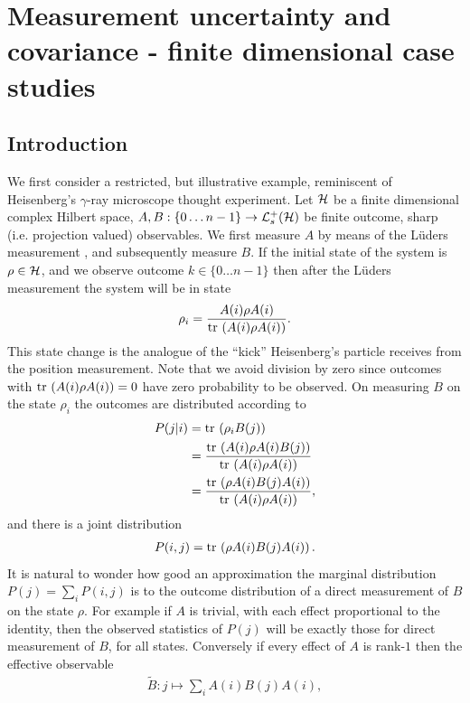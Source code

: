 
\chapter{Measurement uncertainty and covariance - finite dimensional case studies}
\label{chap:cov-meas-ur}
\section{Introduction}

We first consider a restricted, but illustrative example, reminiscent of Heisenberg's $\gamma$-ray microscope thought experiment. Let $\mathcal{H}$ be a finite dimensional complex Hilbert space, $A, B:\{0\hdots n-1\}\to\posops[\hcal]$ be finite outcome, sharp (i.e. projection valued) observables. We first measure $A$ by means of the L\"uders measurement \cites{doi:10.1063/1.528831}{Busch2009-compendium-of-physics-luders}, and subsequently measure $B$. If the initial state of the system is $\rho\in\mathcal{H}$, and we observe outcome $k\in\{0\hdots n-1\}$ then after the L\"uders measurement the system will be in state
\begin{align}
  \rho_i = \frac{A(i)\rho A(i)}{\tr{A(i)\rho A(i)}}.
\end{align}
This state change is the analogue of the ``kick'' Heisenberg's particle receives from the position measurement. Note that we avoid division by zero since outcomes with $\tr{A(i)\rho A(i)} = 0$ have zero probability to be observed. 
On measuring $B$ on the state $\rho_i$ the outcomes are distributed according to
\begin{align}
  P(j|i) &= \tr{\rho_i B(j)}\\
         &= \frac{\tr{A(i)\rho A(i) B(j)}}{\tr{A(i)\rho A(i)}}\\
         &= \frac{\tr{\rho A(i) B(j)A(i)}}{\tr{A(i)\rho A(i)}},
\end{align}
and there is a joint distribution
\begin{align}
  P(i,j) = \tr{\rho A(i) B(j)A(i)}.
\end{align}
It is natural to wonder how good an approximation the marginal distribution $P(j) = \sum_i P(i,j)$ is to the outcome distribution of a direct measurement of $B$ on the state $\rho$. For example if $A$ is trivial, with each effect proportional to the identity, then the observed statistics of $P(j)$ will be exactly those for direct measurement of $B$, for all states. Conversely if every effect of $A$ is rank-$1$ then the effective observable
\begin{align}
  \tilde{B}:j\mapsto \sum_i A(i)B(j)A(i),
\end{align}
